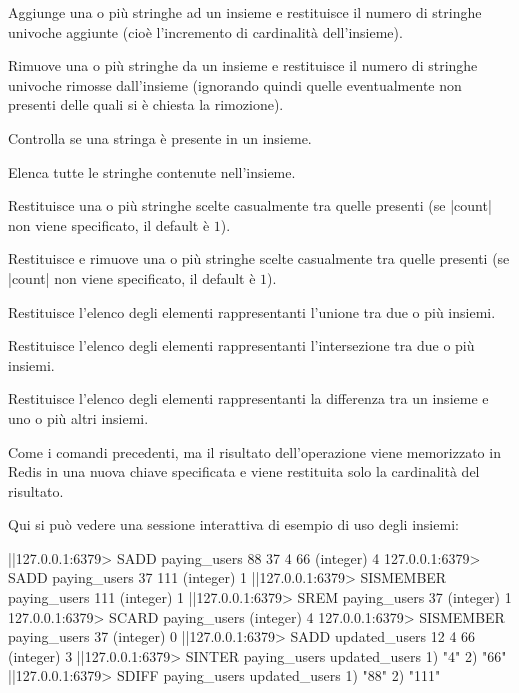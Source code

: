 \begin{description}[style=nextline,font={\bfseries\ttfamily}]
	\item[{SADD key ele [ele\dots]}] Aggiunge una o più stringhe ad un insieme e restituisce
		il numero di stringhe univoche aggiunte (cioè l'incremento di cardinalità dell'insieme).
	\item[{SREM key ele [ele\dots]}] Rimuove una o più stringhe da un insieme e restituisce
		il numero di stringhe univoche rimosse dall'insieme (ignorando quindi quelle eventualmente
		non presenti delle quali si è chiesta la rimozione).
	\item[SISMEMBER key ele] Controlla se una stringa è presente in un insieme.
	\item[SMEMBERS key] Elenca tutte le stringhe contenute nell'insieme.
	\item[{SRANDMEMBER key [count]}] Restituisce una o più stringhe scelte casualmente tra
		quelle presenti (se \cverb|count| non viene specificato, il default è $1$).
	\item[{SPOP key [count]}] Restituisce e rimuove una o più stringhe scelte casualmente tra
		quelle presenti (se \cverb|count| non viene specificato, il default è $1$).
	\item[{SUNION key [key\dots]}] Restituisce l'elenco degli elementi rappresentanti l'unione tra
		due o più insiemi.
	\item[{SINTER key [key\dots]}] Restituisce l'elenco degli elementi rappresentanti l'intersezione
		tra due o più insiemi.
	\item[{SDIFF key [key\dots]}] Restituisce l'elenco degli elementi rappresentanti la differenza
		tra un insieme e uno o più altri insiemi.
	\item[{SUNIONSTORE/SINTERSTORE/SDIFFSTORE key [key\dots]}] 
		Come i comandi precedenti, ma il risultato dell'operazione viene memorizzato in Redis in una
		nuova chiave specificata e viene restituita solo la cardinalità del risultato.
\end{description}

Qui si può vedere una sessione interattiva di esempio di uso degli insiemi:

\begin{commentedsource}[style=redis]
|\lnote|127.0.0.1:6379> SADD paying_users 88 37 4 66
(integer) 4
127.0.0.1:6379> SADD paying_users 37 111
(integer) 1
|\lnote|127.0.0.1:6379> SISMEMBER paying_users 111
(integer) 1
|\lnote|127.0.0.1:6379> SREM paying_users 37
(integer) 1
127.0.0.1:6379> SCARD paying_users
(integer) 4
127.0.0.1:6379> SISMEMBER paying_users 37
(integer) 0
|\lnote|127.0.0.1:6379> SADD updated_users 12 4 66
(integer) 3
|\lnote|127.0.0.1:6379> SINTER paying_users updated_users
1) "4"
2) "66"
|\lnote|127.0.0.1:6379> SDIFF paying_users updated_users
1) "88"
2) "111"
\end{commentedsource}

